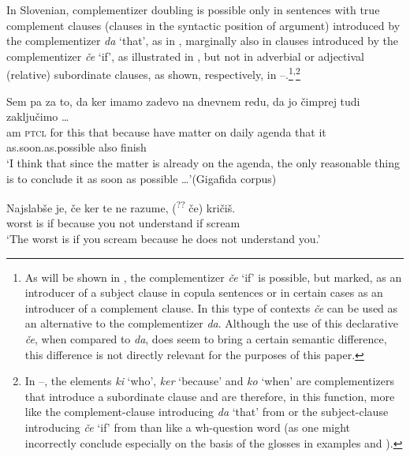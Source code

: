 \documentclass[output=paper,
]{langscibook}
\begin{document}
In Slovenian, complementizer doubling is possible only in sentences with true complement clauses (clauses in the syntactic position of argument) introduced by the complementizer \textit{da} `that', as in , marginally also in clauses introduced by the complementizer \textit{če} `if', as illustrated in , but not in adverbial or adjectival (relative) subordinate clauses, as shown, respectively, in --.\footnote{As will be shown in , the complementizer \textit{če} `if' is possible, but marked, as an introducer of a subject clause in copula sentences or in certain cases as an introducer of a complement clause. In this type of contexts \textit{če} can be used as an alternative to the complementizer \textit{da}. Although the use of this declarative \textit{če}, when compared to \textit{da}, does seem to bring a certain semantic difference, this difference is not directly relevant for the purposes of this paper.}\textsuperscript{,}\footnote{In --, the elements \textit{ki} `who', \textit{ker} `because' and \textit{ko} `when' are complementizers that introduce a subordinate clause and are therefore, in this function, more like the complement-clause introducing \textit{da} `that' from  or the subject-clause introducing \textit{če} `if' from  than like a wh-question word (as one might incorrectly conclude especially on the basis of the glosses in examples  and ).}

\begin{exe} 
\ex \label{ex:plesnicar:nine}
\gll  Sem	pa	za	to,	da	ker		imamo	zadevo	na dnevnem	redu,	da	jo	čimprej	tudi	zaključimo {\ldots}\\
 am	\textsc{ptcl}	for	this	that	because	have	matter	on daily		agenda	that	it	as.soon.as.possible		also	finish	\\
\trans `I think that since the matter is already on the agenda, the only reasonable thing is to conclude it as soon as possible {\ldots}'\hfill (Gigafida corpus) 
\end{exe}

\begin{exe} 
\ex \label{ex:plesnicar:ten}
\gll Najslabše 	je,	če	ker		te	ne	razume,	(\textsuperscript{??}\hspace{-2pt} če) kričiš. \\
	worst		is	if	because	you	not	understand	{} if scream\\
\trans `The worst is if you scream because he does not understand you.' 
\end{exe}
\end{document}
